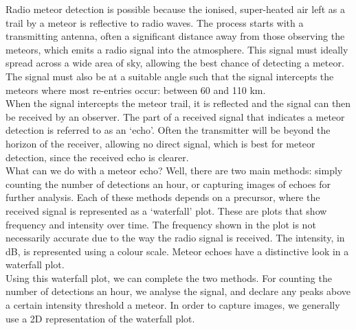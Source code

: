 \documentclass[12pt]{article}
\begin{document}
\large{
Radio meteor detection is possible because the ionised, super-heated air left as
a trail by a meteor is reflective to radio waves. The process starts with a
transmitting antenna, often a significant distance away from those observing the
meteors, which emits a radio signal into the atmosphere. This signal must
ideally spread across a wide area of sky, allowing the best chance of detecting
a meteor. The signal must also be at a suitable angle such that the signal
intercepts the meteors where most re-entries occur: between 60 and 110 km.\\

When the signal intercepts the meteor trail, it is reflected and the signal can
then be received by an observer. The part of a received signal that indicates a
meteor detection is referred to as an `echo'. Often the transmitter will be
beyond the horizon of the receiver, allowing no direct signal, which is best for
meteor detection, since the received echo is clearer.\\

What can we do with a meteor echo? Well, there are two main methods: simply
counting the number of detections an hour, or capturing images of echoes for
further analysis. Each of these methods depends on a precursor, where the
received signal is represented as a `waterfall' plot. These are plots that show
frequency and intensity over time. The frequency shown in the plot is not
necessarily accurate due to the way the radio signal is received. The intensity,
in dB, is represented using a colour scale. Meteor echoes have a distinctive
look in a waterfall plot. \\

Using this waterfall plot, we can complete the two methods. For counting the
number of detections an hour, we analyse the signal, and declare any peaks above
a certain intensity threshold a meteor. In order to capture images, we generally
use a 2D representation of the waterfall plot. \\
}
\end{document}
